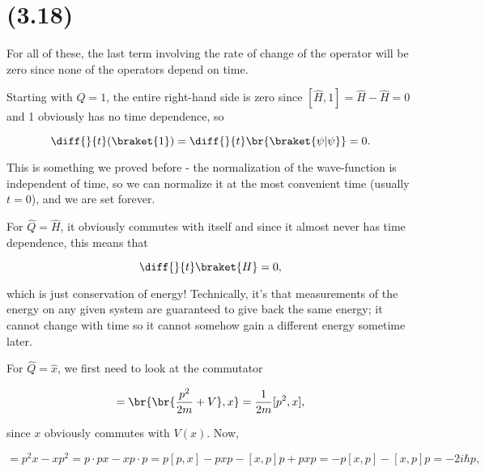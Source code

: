 \section{(3.18)}



For all of these, the last term involving the rate of change of the operator will be zero since none of the operators depend on time.


\begin{parts}
    


\item Starting with $Q=1$, the entire right-hand side is zero since $[\hat{H},1] = \hat{H} - \hat{H} = 0$ and 1 obviously has no time dependence, so

\begin{equation}
    \diff{}{t}(\braket{1}) = \diff{}{t}\br{\braket{\psi|\psi}} = 0.
\end{equation}

This is something we proved before - the normalization of the wave-function is independent of time, so we can normalize it at the most convenient time (usually $t=0$), and we are set forever.


\item For $\hat{Q}=\hat{H}$, it obviously commutes with itself and since it almost never has time dependence, this means that 

\begin{equation}
    \diff{}{t}\braket{H} = 0,
\end{equation}

which is just conservation of energy! Technically, it's that measurements of the energy on any given system are guaranteed to give back the same energy; it cannot change with time so it cannot somehow gain a different energy sometime later.



\item For $\hat{Q} = \hat{x}$, we first need to look at the commutator

\begin{equation}
    [\hat{H},x] = \br{\br{\frac{p^2}{2m} + V},x} = \frac{1}{2m}[p^2,x],
\end{equation}

since $x$ obviously commutes with $V(x)$. Now,

\begin{equation}
    [p^2,x] = p^2x - xp^2 = p \cdot px - xp \cdot p = p[p,x] - pxp - [x,p]p + pxp = -p[x,p] - [x,p]p = -2i\hbar p,
\end{equation}


\end{parts}
